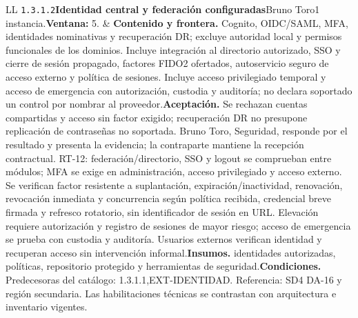 \begin{longtable}{L{\tabcolsep\relax}L{\tabcolsep\relax}}
\texttt{1.\allowbreak{}3.\allowbreak{}1.\allowbreak{}2}\newline{}\textbf{Identidad central y federación configuradas}\newline{}Bruno Toro\newline{}1 instancia.\newline{}\textbf{Ventana:} 5. & \textbf{Contenido y frontera.} Cognito, OIDC/SAML, MFA, identidades nominativas y recuperación DR; excluye autoridad local y permisos funcionales de los dominios. Incluye integración al directorio autorizado, SSO y cierre de sesión propagado, factores FIDO2 ofertados, autoservicio seguro de acceso externo y política de sesiones. Incluye acceso privilegiado temporal y acceso de emergencia con autorización, custodia y auditoría; no declara soportado un control por nombrar al proveedor.\newline{}\textbf{Aceptación.} Se rechazan cuentas compartidas y acceso sin factor exigido; recuperación DR no presupone replicación de contraseñas no soportada. Bruno Toro, Seguridad, responde por el resultado y presenta la evidencia; la contraparte mantiene la recepción contractual. RT-12: federación/directorio, SSO y logout se comprueban entre módulos; MFA se exige en administración, acceso privilegiado y acceso externo. Se verifican factor resistente a suplantación, expiración/inactividad, renovación, revocación inmediata y concurrencia según política recibida, credencial breve firmada y refresco rotatorio, sin identificador de sesión en URL. Elevación requiere autorización y registro de sesiones de mayor riesgo; acceso de emergencia se prueba con custodia y auditoría. Usuarios externos verifican identidad y recuperan acceso sin intervención informal.\newline{}\textbf{Insumos.} identidades autorizadas, políticas, repositorio protegido y herramientas de seguridad.\newline{}\textbf{Condiciones.} Predecesoras del catálogo: 1.3.1.1,EXT-IDENTIDAD. Referencia: SD4 DA-16 y región secundaria. Las habilitaciones técnicas se contrastan con arquitectura e inventario vigentes.\\\hline

\end{longtable}

